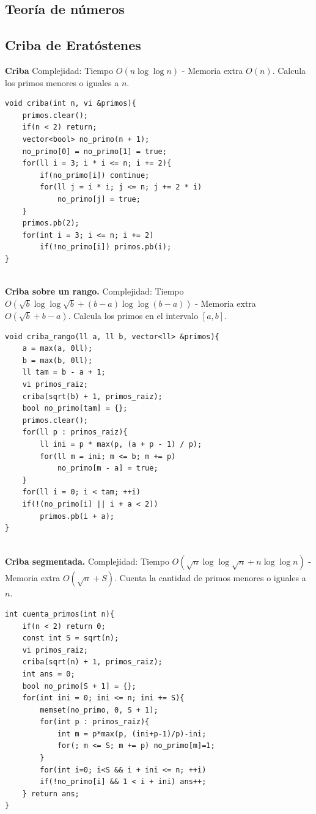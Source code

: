\documentclass[10pt,spanish,mexico]{article}
\numberwithin{equation}{section}
\begin{document}
\begin{multicols}{2}
\vspace{-1.2\baselineskip}
\hrulefill
\section{Teoría de números}
\subsection{Criba de Eratóstenes}
\textbf{Criba} Complejidad: Tiempo $O(n\log \log n)$ - Memoria extra $O(n)$. Calcula los primos menores o iguales a $n$.
\begin{verbatim}
void criba(int n, vi &primos){
    primos.clear();
    if(n < 2) return;
    vector<bool> no_primo(n + 1);
    no_primo[0] = no_primo[1] = true;
    for(ll i = 3; i * i <= n; i += 2){
        if(no_primo[i]) continue;
        for(ll j = i * i; j <= n; j += 2 * i)
            no_primo[j] = true;
    }
    primos.pb(2);
    for(int i = 3; i <= n; i += 2)
        if(!no_primo[i]) primos.pb(i);
}
\end{verbatim}

\vspace{-1.2\baselineskip}
\hrulefill\\
\textbf{Criba sobre un rango.} Complejidad: Tiempo $O(\sqrt{b} \log \log \sqrt{b} + (b - a)\log \log(b - a))$ - Memoria extra $O(\sqrt{b} + b - a)$. Calcula los primos en el intervalo $[a, b]$.
\begin{verbatim}
void criba_rango(ll a, ll b, vector<ll> &primos){
    a = max(a, 0ll);
    b = max(b, 0ll);
    ll tam = b - a + 1;
    vi primos_raiz;
    criba(sqrt(b) + 1, primos_raiz);
    bool no_primo[tam] = {};
    primos.clear();
    for(ll p : primos_raiz){
        ll ini = p * max(p, (a + p - 1) / p);
        for(ll m = ini; m <= b; m += p)
            no_primo[m - a] = true;
    }
    for(ll i = 0; i < tam; ++i)
    if(!(no_primo[i] || i + a < 2))
        primos.pb(i + a);
}
\end{verbatim}

\vspace{-1.2\baselineskip}
\hrulefill\\
\textbf{Criba segmentada.} Complejidad: Tiempo $O(\sqrt{n}\log \log \sqrt{n} + n\log \log n)$ - Memoria extra $O(\sqrt{n} + S)$. Cuenta la cantidad de primos menores o iguales a $n$.
\begin{verbatim}
int cuenta_primos(int n){
    if(n < 2) return 0;
    const int S = sqrt(n);
    vi primos_raiz;
    criba(sqrt(n) + 1, primos_raiz);
    int ans = 0;
    bool no_primo[S + 1] = {};
    for(int ini = 0; ini <= n; ini += S){
        memset(no_primo, 0, S + 1);
        for(int p : primos_raiz){
            int m = p*max(p, (ini+p-1)/p)-ini;
            for(; m <= S; m += p) no_primo[m]=1;
        }
        for(int i=0; i<S && i + ini <= n; ++i)
        if(!no_primo[i] && 1 < i + ini) ans++;
    } return ans;
}
\end{verbatim}


\end{multicols}
\end{document}

